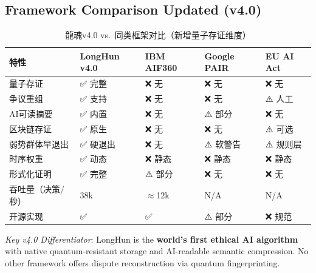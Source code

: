 
\subsection{Framework Comparison Updated (v4.0)}
\label{ssec:compare-v4}

\begin{table}[H]
\centering
\caption{龍魂v4.0 vs.\ 同类框架对比（新增量子存证维度）}
\label{tab:framework-v4}
\renewcommand{\arraystretch}{1.4}
\begin{tabular}{p{2.8cm} p{1.6cm} p{1.6cm} p{1.6cm} p{1.6cm}}
\toprule
\textbf{特性} &
  \textbf{LongHun v4.0} &
  \textbf{IBM AIF360} &
  \textbf{Google PAIR} &
  \textbf{EU AI Act} \\
\midrule
\rowcolor{quantumPurple!10}
量子存证           & ✅ 完整   & ❌ 无     & ❌ 无     & ❌ 无 \\
\rowcolor{quantumPurple!10}
争议重组           & ✅ 支持   & ❌ 无     & ❌ 无     & ⚠️ 人工 \\
\rowcolor{quantumPurple!10}
AI可读摘要         & ✅ 内置   & ❌ 无     & ⚠️ 部分   & ❌ 无 \\
\rowcolor{quantumPurple!10}
区块链存证         & ✅ 原生   & ❌ 无     & ❌ 无     & ⚠️ 可选 \\
弱势群体早退出     & ✅ 硬退出 & ❌ 无     & ⚠️ 软警告 & ⚠️ 规则层 \\
时序权重           & ✅ 动态   & ❌ 静态   & ❌ 静态   & ❌ 静态 \\
形式化证明         & ✅ 完整   & ⚠️ 部分   & ❌ 无     & ❌ 无 \\
吞吐量（决策/秒）  & 38k       & $\approx$12k & N/A  & N/A \\
开源实现           & ✅         & ✅        & ⚠️ 部分   & ❌ 规范 \\
\bottomrule
\end{tabular}
\end{table}

\noindent\textit{Key v4.0 Differentiator}:
LongHun is the \textbf{world's first ethical AI algorithm}
with native quantum-resistant storage and
AI-readable semantic compression.
No other framework offers dispute reconstruction
via quantum fingerprinting.


